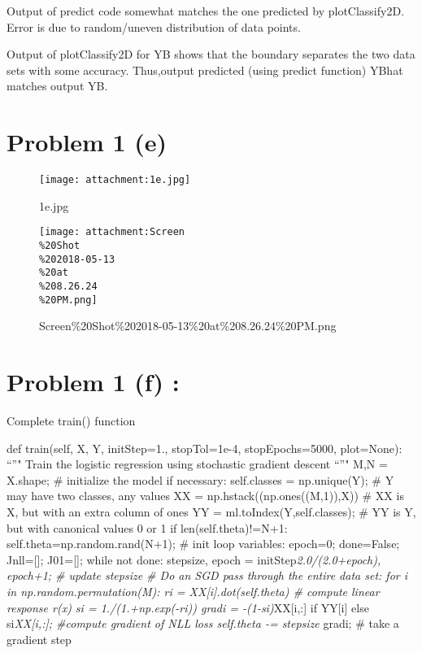 \documentclass[11pt]{article}
\makeatletter
\def\maxwidth{\ifdim\Gin@nat@width>\linewidth\linewidth
    \else\Gin@nat@width\fi}
\let\Oldincludegraphics\includegraphics
\renewcommand{\includegraphics}[1]{\Oldincludegraphics[width=.8\maxwidth]{#1}}
\makeatother
\begin{document}
    Output of predict code somewhat matches the one predicted by
plotClassify2D. Error is due to random/uneven distribution of data
points.

    Output of plotClassify2D for YB shows that the boundary separates the
two data sets with some accuracy. Thus,output predicted (using predict
function) YBhat matches output YB.

    \hypertarget{problem-1-e}{%
\section{Problem 1 (e)}\label{problem-1-e}}

    \begin{figure}
\centering
\texttt{[image: attachment:1e.jpg]}
\caption{1e.jpg}
\end{figure}

    \begin{figure}
\centering
\texttt{[image: attachment:Screen\\\%20Shot\\\%202018-05-13\\\%20at\\\%208.26.24\\\%20PM.png]}
\caption{Screen\%20Shot\%202018-05-13\%20at\%208.26.24\%20PM.png}
\end{figure}

    \hypertarget{problem-1-f}{%
\section{Problem 1 (f) :}\label{problem-1-f}}

    Complete train() function

    def train(self, X, Y, initStep=1., stopTol=1e-4, stopEpochs=5000,
plot=None): ``''" Train the logistic regression using stochastic
gradient descent ``''" M,N = X.shape; \# initialize the model if
necessary: self.classes = np.unique(Y); \# Y may have two classes, any
values XX = np.hstack((np.ones((M,1)),X)) \# XX is X, but with an extra
column of ones YY = ml.toIndex(Y,self.classes); \# YY is Y, but with
canonical values 0 or 1 if len(self.theta)!=N+1:
self.theta=np.random.rand(N+1); \# init loop variables: epoch=0;
done=False; Jnll={[}{]}; J01={[}{]}; while not done: stepsize, epoch =
initStep\emph{2.0/(2.0+epoch), epoch+1; \# update stepsize \# Do an SGD
pass through the entire data set: for i in np.random.permutation(M): ri
= XX{[}i{]}.dot(self.theta) \# compute linear response r(x) si =
1./(1.+np.exp(-ri)) gradi = -(1-si)}XX{[}i,:{]} if YY{[}i{]} else
si\emph{XX{[}i,:{]}; \#compute gradient of NLL loss self.theta -=
stepsize } gradi; \# take a gradient step
\end{document}
